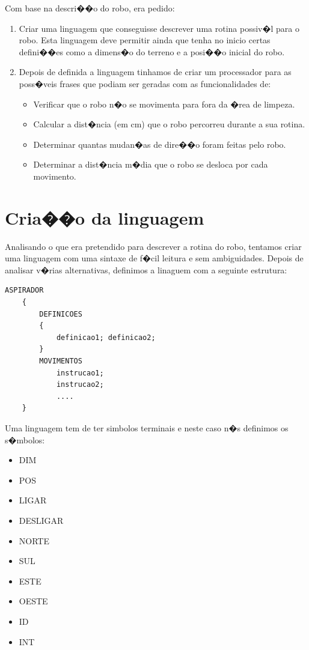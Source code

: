 \documentclass[a4paper]{article}
\begin{document}
Com base na descri��o do robo, era pedido:
\begin{enumerate}
	\item Criar uma linguagem que conseguisse descrever uma rotina possiv�l para o robo. Esta linguagem deve permitir ainda que tenha no inicio certas defini��es como a dimens�o do terreno e a posi��o inicial do robo.
	\item Depois de definida a linguagem tinhamos de criar um processador para as poss�veis frases que podiam ser geradas com as funcionalidades de:
	\begin{itemize}
		\item Verificar que o robo n�o se movimenta para fora da �rea de limpeza.
		\item Calcular a dist�ncia (em cm) que o robo percorreu durante a sua rotina.
		\item Determinar quantas mudan�as de dire��o foram feitas pelo robo.
		\item Determinar a dist�ncia m�dia que o robo se desloca por cada movimento.
	\end{itemize}
\end{enumerate}


\section{Cria��o da linguagem}
Analisando o que era pretendido para descrever a rotina do robo, tentamos criar uma linguagem com uma sintaxe de f�cil leitura e sem ambiguidades. Depois de analisar v�rias alternativas, definimos a linaguem com a seguinte estrutura:
\begin{lstlisting}[style=gramatica]
    ASPIRADOR
    {
        DEFINICOES
        {
            definicao1; definicao2;
        }
        MOVIMENTOS
            instrucao1;
            instrucao2;
            ....
    }
\end{lstlisting}

Uma linguagem tem de ter simbolos terminais e neste caso n�s definimos os s�mbolos:
\begin{itemize}
	\item DIM
	\item POS
	\item LIGAR
	\item DESLIGAR
	\item NORTE
	\item SUL
	\item ESTE
	\item OESTE
	\item ID
	\item INT
\end{itemize}
\end{document}
